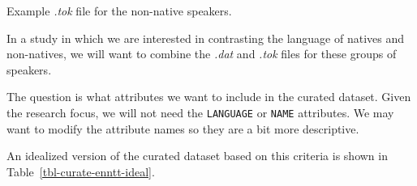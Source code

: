 \documentclass[
  letterpaper,
]{book}
\newenvironment{Shaded}{\begin{snugshade}}{\end{snugshade}}
\newcommand{\NormalTok}[1]{\textcolor[rgb]{0.00,0.00,0.00}{#1}}
\theoremstyle{definition}
\theoremstyle{remark}
\begin{document}
\begin{codelisting}

\caption{\label{lst-curate-enntt-nonnatives-tok}Example \emph{.tok} file
for the non-native speakers.}

\centering{

\begin{Shaded}
\begin{Highlighting}[]
\NormalTok{The Commission is following with interest the planned construction of a nuclear power plant in Akkuyu , Turkey and recognises the importance of ensuring that the construction of the new plant follows the highest internationally accepted nuclear safety standards .}
\NormalTok{According to our information , the decision on the selection of a bidder has not been taken yet .}
\end{Highlighting}
\end{Shaded}

}

\end{codelisting}%

In a study in which we are interested in contrasting the language of
natives and non-natives, we will want to combine the \emph{.dat} and
\emph{.tok} files for these groups of speakers.

The question is what attributes we want to include in the curated
dataset. Given the research focus, we will not need the
\texttt{LANGUAGE} or \texttt{NAME} attributes. We may want to modify the
attribute names so they are a bit more descriptive.

An idealized version of the curated dataset based on this criteria is
shown in Table~\ref{tbl-curate-enntt-ideal}.
\end{document}
